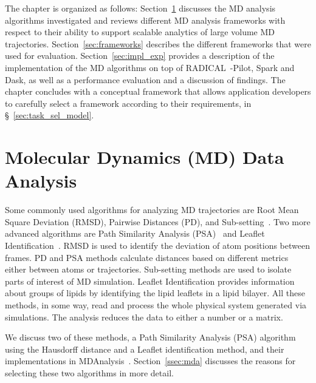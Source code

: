 The chapter is organized as follows: Section~\ref{sec:md_use_cases} discusses the MD analysis algorithms investigated and reviews different MD analysis frameworks with respect to their ability to support scalable analytics of large volume MD trajectories. 
Section~\ref{sec:frameworks} describes the different frameworks that were used for evaluation. 
Section~\ref{sec:impl_exp} provides a description of the implementation of the MD algorithms on top of RADICAL~-Pilot, Spark and  Dask, as well as a performance evaluation and a discussion of findings. 
The chapter concludes with a conceptual framework that allows application developers to carefully select a framework according to their requirements, in  \S~\ref{sec:task_sel_model}.
%

\section{Molecular Dynamics (MD) Data Analysis}
\label{sec:md_use_cases}
Some commonly used algorithms for analyzing MD trajectories are Root Mean Square Deviation (RMSD), Pairwise Distances (PD), and Sub-setting~\cite{mura2014biomolecules}.
Two more advanced algorithms are Path Similarity Analysis (PSA)~\cite{seyler2015path} and Leaflet Identification~\cite{michaud2011mdanalysis}.
RMSD is used to identify the deviation of atom positions between frames.
PD and PSA methods calculate distances based on different metrics either between atoms or trajectories.
Sub-setting methods are used to isolate parts of interest of MD simulation.
Leaflet Identification provides information about groups of lipids by identifying the lipid leaflets in a lipid bilayer.
All these methods, in some way, read and process the whole physical system generated via simulations.
The analysis reduces the data to either a number or a matrix.

We discuss two of these methods, a Path Similarity Analysis (PSA) algorithm using the Hausdorff distance and a Leaflet identification method, and their implementations in MDAnalysis~\cite{michaud2011mdanalysis,gowers2016mdanalysis}.
Section~\ref{ssec:mda} discusses the reasons for selecting these two algorithms in more detail.

